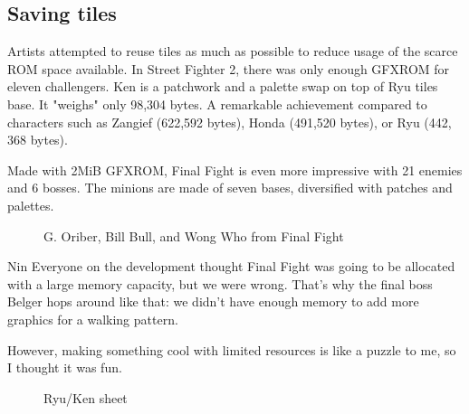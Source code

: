 \subsection{Saving tiles}
Artists attempted to reuse tiles as much as possible to reduce usage of the scarce ROM space available. In Street Fighter 2, there was only enough GFXROM for eleven challengers. Ken is a patchwork and a palette swap on top of Ryu tiles base. It "weighs" only 98,304 bytes. A remarkable achievement compared to characters such as Zangief (622,592 bytes), Honda (491,520 bytes), or Ryu (442, 368 bytes).

\begin{minipage}[t]{0.19\linewidth}
\end{minipage}%
\hfill%
\begin{minipage}[t]{0.19\linewidth}
\end{minipage}
\hfill%
\begin{minipage}[t]{0.19\linewidth}
\end{minipage}%
\hfill%
\begin{minipage}[t]{0.19\linewidth}
\end{minipage}
\hfill%
\begin{minipage}[t]{0.19\linewidth}
\end{minipage}


Made with 2MiB GFXROM, Final Fight is even more impressive with 21 enemies and 6 bosses. The minions are made of seven bases, diversified with patches and palettes.

\begin{figure}[H]
\caption*{G. Oriber, Bill Bull, and Wong Who from Final Fight}
\end{figure}


\begin{q}{Nin\cite{1991_retro}}
Everyone on the development thought Final Fight was going to be allocated with a large memory capacity, but we were wrong.
That's why the final boss Belger hops around like that: we didn't have enough memory to add more graphics for a walking pattern. 

However, making something cool with limited resources is like a puzzle to me, so I thought it was fun. 
\end{q}


 \begin{figure}[H]
\caption*{Ryu/Ken sheet}
\end{figure}

